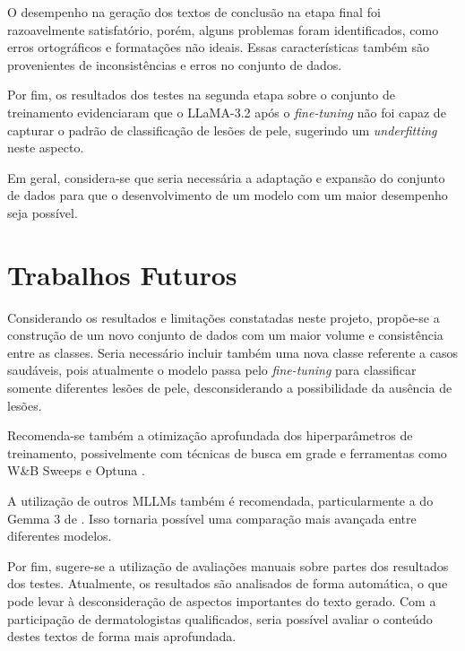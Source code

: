 O desempenho na geração dos textos de conclusão na etapa final foi razoavelmente satisfatório, porém, alguns problemas
foram identificados, como erros ortográficos e formatações não ideais. Essas características também são provenientes de
inconsistências e erros no conjunto de dados.

Por fim, os resultados dos testes na segunda etapa sobre o conjunto de treinamento evidenciaram que o \ac{LLaMA}-3.2
após o \textit{fine-tuning} não foi capaz de capturar o padrão de classificação de lesões de pele, sugerindo um
\textit{underfitting} neste aspecto.

Em geral, considera-se que seria necessária a adaptação e expansão do conjunto de dados para que o desenvolvimento de
um modelo com um maior desempenho seja possível.

\section{Trabalhos Futuros}

Considerando os resultados e limitações constatadas neste projeto, propõe-se a construção de um novo conjunto de dados
com um maior volume e consistência entre as classes. Seria necessário incluir também uma nova classe referente a casos
saudáveis, pois atualmente o modelo passa pelo \textit{fine-tuning} para classificar somente diferentes lesões de pele,
desconsiderando a possibilidade da ausência de lesões.

Recomenda-se também a otimização aprofundada dos hiperparâmetros de treinamento, possivelmente com técnicas de busca em
grade e ferramentas como W\&B Sweeps e Optuna \cite{wab_sweeps, optuna_2019}.

A utilização de outros \acp{MLLM} também é recomendada, particularmente a do Gemma 3 de \textcite{team2025gemma}. Isso
tornaria possível uma comparação mais avançada entre diferentes modelos.

Por fim, sugere-se a utilização de avaliações manuais sobre partes dos resultados dos testes. Atualmente, os resultados
são analisados de forma automática, o que pode levar à desconsideração de aspectos importantes do texto gerado. Com a
participação de dermatologistas qualificados, seria possível avaliar o conteúdo destes textos de forma mais
aprofundada.

